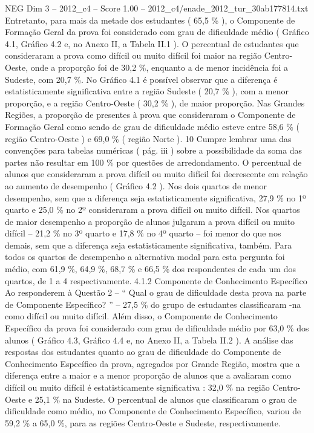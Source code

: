 \begin{textsample}{NEG Dim 3 – 2012\_c4 – Score 1.00 – 2012\_c4/enade\_2012\_tur\_30ab177814.txt}
Entretanto, para mais da metade dos estudantes ( 65,5 \% ), o Componente de Formação Geral da prova foi considerado com grau de dificuldade médio ( Gráfico 4.1, Gráfico 4.2 e, no Anexo II, a Tabela II.1 ).
O percentual de estudantes que consideraram a prova como difícil ou muito difícil foi maior na região Centro-Oeste, onde a proporção foi de 30,2 \%, enquanto a de menor incidência foi a Sudeste, com 20,7 \%.
No Gráfico 4.1 é possível observar que a diferença é estatisticamente significativa entre a região Sudeste ( 20,7 \% ), com a menor proporção, e a região Centro-Oeste ( 30,2 \% ), de maior proporção.
Nas Grandes Regiões, a proporção de presentes à prova que consideraram o Componente de Formação Geral como sendo de grau de dificuldade médio esteve entre 58,6 \% ( região Centro-Oeste ) e 69,0 \% ( região Norte ). 10 Cumpre lembrar uma das convenções para tabelas numéricas ( pág. iii ) sobre a possibilidade da soma das partes não resultar em 100 \% por questões de arredondamento.
O percentual de alunos que consideraram a prova difícil ou muito difícil foi decrescente em relação ao aumento de desempenho ( Gráfico 4.2 ).
Nos dois quartos de menor desempenho, sem que a diferença seja estatisticamente significativa, 27,9 \% no 1º quarto e 25,0 \% no 2º consideraram a prova difícil ou muito difícil.
Nos quartos de maior desempenho a proporção de alunos julgaram a prova difícil ou muito difícil – 21,2 \% no 3º quarto e 17,8 \% no 4º quarto – foi menor do que nos demais, sem que a diferença seja estatisticamente significativa, também.
Para todos os quartos de desempenho a alternativa modal para esta pergunta foi médio, com 61,9 \%, 64,9 \%, 68,7 \% e 66,5 \% dos respondentes de cada um dos quartos, de 1 a 4 respectivamente. 4.1.2 Componente de Conhecimento Específico Ao responderem à Questão 2 – “ Qual o grau de dificuldade desta prova na parte de Componente Específico? ” – 27,5 \% do grupo de estudantes classificaram -na como difícil ou muito difícil.
Além disso, o Componente de Conhecimento Específico da prova foi considerado com grau de dificuldade médio por 63,0 \% dos alunos ( Gráfico 4.3, Gráfico 4.4 e, no Anexo II, a Tabela II.2 ).
A análise das respostas dos estudantes quanto ao grau de dificuldade do Componente de Conhecimento Específico da prova, agregados por Grande Região, mostra que a diferença entre a maior e a menor proporção de alunos que a avaliaram como difícil ou muito difícil é estatisticamente significativa : 32,0 \% na região Centro-Oeste e 25,1 \% na Sudeste.
O percentual de alunos que classificaram o grau de dificuldade como médio, no Componente de Conhecimento Específico, variou de 59,2 \% a 65,0 \%, para as regiões Centro-Oeste e Sudeste, respectivamente.

\end{textsample}

